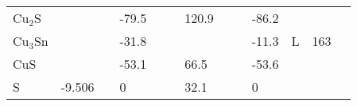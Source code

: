 \documentclass{article}
\begin{document}
\begin{center}
\begin{longtable}{|l|p{2.5cm}|l|p{2.5cm}|l|l|p{2.5cm}|l|l|p{2.5cm}|l|l|l|}
Cu$_2$S           	   &                            &     & -79.5               &     &         & 120.9              &     & \citep{Haynes2013} & -86.2                               &     & \citep{Haynes2013} &  \\
Cu$_3$Sn          	   &                            &     & -31.8               &     & \citep{Wagman1982}     &                    &     &     & -11.3                             & L   & 163 &  \\
CuS              	   &                            &     & -53.1               &     & \citep{Haynes2013}     & 66.5               &     & \citep{Haynes2013} & -53.6                               &     & \citep{Haynes2013} &  \\
S                	   & -9.506                     & \citep{Barin1977} & 0                   &     & \citep{Haynes2013}     & 32.1               &     & \citep{Haynes2013} & 0                                   &     & \citep{Haynes2013} &  \\

\end{longtable}
\end{center}
\end{document}
